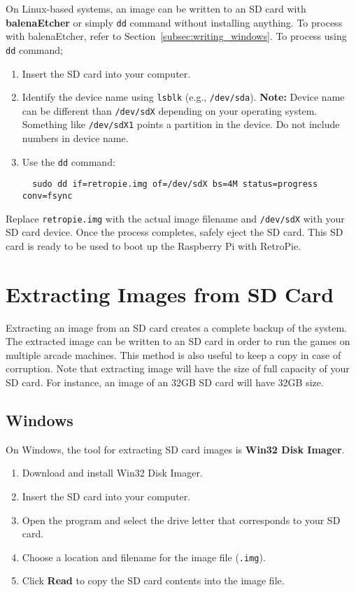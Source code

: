 On Linux-based systems, an image can be written to an SD card with \textbf{balenaEtcher} or simply \texttt{dd} command without installing anything. To process with balenaEtcher, refer to Section~\ref{subsec:writing_windows}. To process using \texttt{dd} command;
\\
\begin{enumerate}
  \item Insert the SD card into your computer.
  \item Identify the device name using \texttt{lsblk} (e.g., \texttt{/dev/sda}).
    \newline\textbf{Note:} Device name can be different than \texttt{/dev/sdX} depending on your operating system. Something like \texttt{/dev/sdX1} points a partition in the device. Do not include numbers in device name.
  \item Use the \texttt{dd} command:
  \begin{verbatim}
  sudo dd if=retropie.img of=/dev/sdX bs=4M status=progress conv=fsync
  \end{verbatim}
\end{enumerate}

Replace \texttt{retropie.img} with the actual image filename and \texttt{/dev/sdX} with your SD card device. Once the process completes, safely eject the SD card. This SD card is ready to be used to boot up the Raspberry Pi with RetroPie.


\section{Extracting Images from SD Card}
\label{sec:extracting_images_sd_card}

Extracting an image from an SD card creates a complete backup of the system. The extracted image can be written to an SD card in order to run the games on multiple arcade machines. This method is also useful to keep a copy in case of corruption. Note that extracting image will have the size of full capacity of your SD card. For instance, an image of an 32GB SD card will have 32GB size.

\subsection{Windows}
\label{subsec:extracting_windows}

On Windows, the tool for extracting SD card images is \textbf{Win32 Disk Imager}.
\begin{enumerate}
  \item Download and install Win32 Disk Imager.
  \item Insert the SD card into your computer.
  \item Open the program and select the drive letter that corresponds to your SD card.
  \item Choose a location and filename for the image file (\texttt{.img}).
  \item Click \textbf{Read} to copy the SD card contents into the image file.
\end{enumerate}

